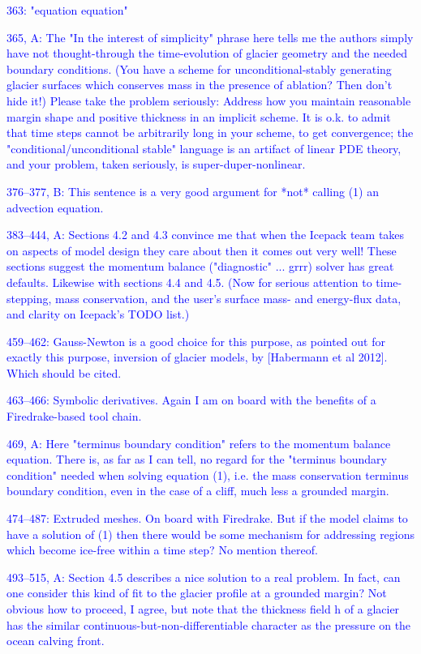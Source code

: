 \documentclass{article}
\theoremstyle{definition}
\theoremstyle{plain}
\begin{document}
\textcolor{blue}{363:  "equation equation"}

\textcolor{blue}{365, A:  The "In the interest of simplicity" phrase here tells me the authors simply have not thought-through the time-evolution of glacier geometry and the needed boundary conditions.  (You have a scheme for unconditional-stably generating glacier surfaces which conserves mass in the presence of ablation?  Then don't hide it!)  Please take the problem seriously:  Address how you maintain reasonable margin shape and positive thickness in an implicit scheme.  It is o.k. to admit that time steps cannot be arbitrarily long in your scheme, to get convergence; the "conditional/unconditional stable" language is an artifact of linear PDE theory, and your problem, taken seriously, is super-duper-nonlinear.}

\textcolor{blue}{376--377, B:  This sentence is a very good argument for *not* calling (1) an advection equation.}

\textcolor{blue}{383--444, A:  Sections 4.2 and 4.3 convince me that when the Icepack team takes on aspects of model design they care about then it comes out very well!  These sections suggest the momentum balance ("diagnostic" ... grrr) solver has great defaults.  Likewise with sections 4.4 and 4.5.  (Now for serious attention to time-stepping, mass conservation, and the user's surface mass- and energy-flux data, and clarity on Icepack's TODO list.)}

\textcolor{blue}{459--462:  Gauss-Newton is a good choice for this purpose, as pointed out for exactly this purpose, inversion of glacier models, by [Habermann et al 2012].  Which should be cited.}

\textcolor{blue}{463--466:  Symbolic derivatives.  Again I am on board with the benefits of a Firedrake-based tool chain.}

\textcolor{blue}{469, A:  Here "terminus boundary condition" refers to the momentum balance equation.  There is, as far as I can tell, no regard for the "terminus boundary condition" needed when solving equation (1), i.e. the mass conservation terminus boundary condition, even in the case of a cliff, much less a grounded margin.}

\textcolor{blue}{474--487:  Extruded meshes.  On board with Firedrake.  But if the model claims to have a solution of (1) then there would be some mechanism for addressing regions which become ice-free within a time step?  No mention thereof.}

\textcolor{blue}{493--515, A:  Section 4.5 describes a nice solution to a real problem.  In fact, can one consider this kind of fit to the glacier profile at a grounded margin?  Not obvious how to proceed, I agree, but note that the thickness field h of a glacier has the similar continuous-but-non-differentiable character as the pressure on the ocean calving front.}
\end{document}
